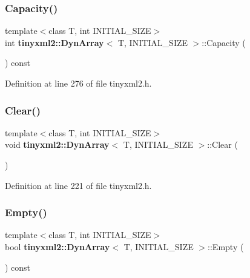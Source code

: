 \subsubsection{Capacity()}
{\footnotesize\ttfamily template$<$class T, int I\+N\+I\+T\+I\+A\+L\+\_\+\+S\+I\+ZE$>$ \\
int \textbf{ tinyxml2\+::\+Dyn\+Array}$<$ T, I\+N\+I\+T\+I\+A\+L\+\_\+\+S\+I\+ZE $>$\+::Capacity (\begin{DoxyParamCaption}{ }\end{DoxyParamCaption}) const\hspace{0.3cm}{\ttfamily [inline]}}



Definition at line 276 of file tinyxml2.\+h.

\mbox{\label{classtinyxml2_1_1_dyn_array_af87a804cd831226d069274b44b74b8bc}} 
\subsubsection{Clear()}
{\footnotesize\ttfamily template$<$class T, int I\+N\+I\+T\+I\+A\+L\+\_\+\+S\+I\+ZE$>$ \\
void \textbf{ tinyxml2\+::\+Dyn\+Array}$<$ T, I\+N\+I\+T\+I\+A\+L\+\_\+\+S\+I\+ZE $>$\+::Clear (\begin{DoxyParamCaption}{ }\end{DoxyParamCaption})\hspace{0.3cm}{\ttfamily [inline]}}



Definition at line 221 of file tinyxml2.\+h.

\mbox{\label{classtinyxml2_1_1_dyn_array_a044fc26f44ed3e96ffaeac542188149e}} 
\subsubsection{Empty()}
{\footnotesize\ttfamily template$<$class T, int I\+N\+I\+T\+I\+A\+L\+\_\+\+S\+I\+ZE$>$ \\
bool \textbf{ tinyxml2\+::\+Dyn\+Array}$<$ T, I\+N\+I\+T\+I\+A\+L\+\_\+\+S\+I\+ZE $>$\+::Empty (\begin{DoxyParamCaption}{ }\end{DoxyParamCaption}) const\hspace{0.3cm}{\ttfamily [inline]}}



